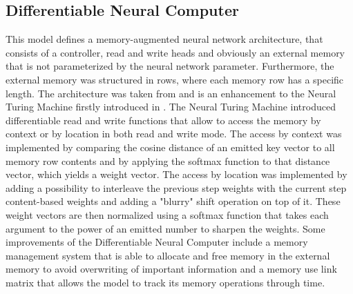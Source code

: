 \documentclass[draft,final]{vutinfth} %
\begin{document}
    \subsection{Differentiable Neural Computer} \label{Differentiable Neural Computer}
    This model defines a memory-augmented neural network architecture, that consists of a controller, read and write heads and obviously an external memory that is not parameterized by the neural network parameter.
    Furthermore, the external memory was structured in rows, where each memory row has a specific length.
    The architecture was taken from \cite{DNC} and is an enhancement to the Neural Turing Machine firstly introduced in \cite{NTM}.
    The Neural Turing Machine introduced differentiable read and write functions that allow to access the memory by context or by location in both read and write mode.
    The access by context was implemented by comparing the cosine distance of an emitted key vector to all memory row contents and by applying the softmax function to that distance vector, which yields a weight vector.
    The access by location was implemented by adding a possibility to interleave the previous step weights with the current step content-based weights and adding a "blurry" shift operation on top of it.
    These weight vectors are then normalized using a softmax function that takes each argument to the power of an emitted number to sharpen the weights.
    Some improvements of the Differentiable Neural Computer include a memory management system that is able to allocate and free memory in the external memory to avoid overwriting of important information and a memory use link matrix that allows the model to track its memory operations through time.
\end{document}
